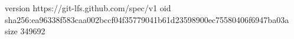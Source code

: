 version https://git-lfs.github.com/spec/v1
oid sha256:ea96338f583caa002bccf04f35779041b61d23598900ec75580406f6947ba03a
size 349692
